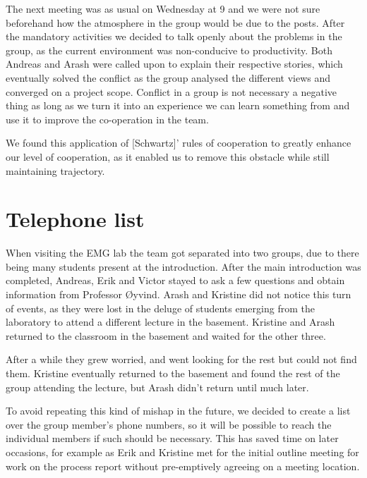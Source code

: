 The next meeting was as usual on Wednesday at 9 and we were not sure beforehand how the atmosphere in the group would be due to the posts.
After the mandatory activities we decided to talk openly about the problems in the group, as the current environment was non-conducive to productivity.
Both Andreas and Arash were called upon to explain their respective stories, which eventually solved the conflict as the group analysed the different views and converged on a project scope.
Conflict in a group is not necessary a negative thing as long as we turn it into an experience we can learn something from and use it to improve the co-operation in the team.

We found this application of [Schwartz]' rules of cooperation to greatly enhance our level of cooperation, as it enabled us to remove this obstacle while still maintaining trajectory.

\section{Telephone list}
When visiting the EMG lab the team got separated into two groups, due to there being many students present at the introduction.
After the main introduction was completed, Andreas, Erik and Victor stayed to ask a few questions and obtain information from Professor Øyvind.
Arash and Kristine did not notice this turn of events, as they were lost in the deluge of students emerging from the laboratory to attend a different lecture in the basement.
Kristine and Arash returned to the classroom in the basement and waited for the other three.

After a while they grew worried, and went looking for the rest but could not find them.
Kristine eventually returned to the basement and found the rest of the group attending the lecture, but Arash didn't return until much later.

To avoid repeating this kind of mishap in the future, we decided to create a list over the group member's phone numbers, so it will be possible to reach the individual members if such should be necessary.
This has saved time on later occasions, for example as Erik and Kristine met for the initial outline meeting for work on the process report without pre-emptively agreeing on a meeting location.

